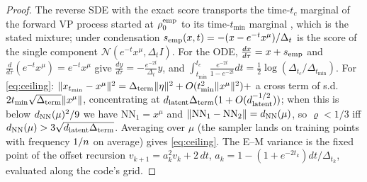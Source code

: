\begin{proof}
The reverse SDE with the exact score transports the time-$t_c$ marginal of the forward VP process started at $\rho^{\rm emp}_0$ to its time-$t_{\min}$ marginal \citep{song2021scoresde}, which is the stated mixture; under condensation $s_{\rm emp}(x,t)=-(x-e^{-t}x^\mu)/\Delta_t$ is the score of the single component $\mathcal N(e^{-t}x^\mu,\Delta_tI)$. For the ODE, $\frac{dx}{d\tau}=x+s_{\rm emp}$ and $\frac{d}{d\tau}(e^{-t}x^\mu)=e^{-t}x^\mu$ give $\frac{dy}{d\tau}=-\frac{e^{-2t}}{\Delta_t}y$, and $\int_{t_{\min}}^{t_c}\frac{e^{-2t}}{1-e^{-2t}}dt=\tfrac12\log(\Delta_{t_c}/\Delta_{t_{\min}})$. For \eqref{eq:ceiling}: $\|x_{t_{\min}}-x^\mu\|^2=\Delta_{\rm term}\|\eta\|^2+O(t_{\min}^2\|x^\mu\|^2)+$ a cross term of s.d.\ $2t_{\min}\sqrt{\Delta_{\rm term}}\|x^\mu\|$, concentrating at $d_{\mathrm{latent}}\Delta_{\rm term}(1+O(d_{\mathrm{latent}}^{-1/2}))$; when this is below $d_{\rm NN}(\mu)^2/9$ we have $\mathrm{NN}_1=x^\mu$ and $\|\mathrm{NN}_1-\mathrm{NN}_2\|=d_{\rm NN}(\mu)$, so $\varrho<1/3$ iff $d_{\rm NN}(\mu)>3\sqrt{d_{\mathrm{latent}}\Delta_{\rm term}}$. Averaging over $\mu$ (the sampler lands on training points with frequency $1/n$ on average) gives \eqref{eq:ceiling}. The E--M variance is the fixed point of the offset recursion $v_{k+1}=a_k^2v_k+2\,dt$, $a_k=1-(1+e^{-2t_k})dt/\Delta_{t_k}$, evaluated along the code's grid.
\end{proof}


